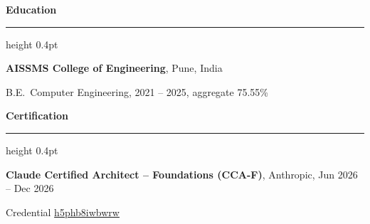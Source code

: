 \documentclass[letterpaper,10pt]{article}
\newcommand{\rsection}[1]{%
  \vspace{6pt}%
  {\bfseries #1}\par
  \vspace{1pt}%
  \hrule height 0.4pt
  \vspace{3pt}%
}
\begin{document}
\rsection{Education}

\textbf{AISSMS College of Engineering}, Pune, India\par
B.E.\ Computer Engineering, 2021 -- 2025, aggregate 75.55\%

\rsection{Certification}

\textbf{Claude Certified Architect -- Foundations (CCA-F)}, Anthropic, Jun 2026 -- Dec 2026\par
Credential \href{https://verify.skilljar.com/c/h5phb8iwbwrw}{h5phb8iwbwrw}
\end{document}
